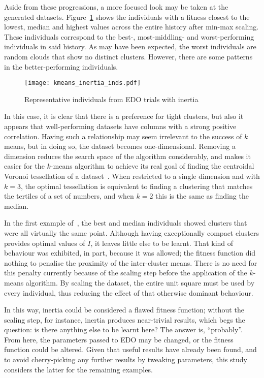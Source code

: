 Aside from these progressions, a more focused look may be taken at the generated
datasets. Figure~\ref{fig:kmeans_inertia_inds} shows the individuals with a
fitness closest to the lowest, median and highest values across the entire
history after min-max scaling. These individuals correspond to the best-,
most-middling- and worst-performing individuals in said history. As may have
been expected, the worst individuals are random clouds that show no distinct
clusters. However, there are some patterns in the better-performing individuals.

\begin{figure}[htbp]
    \centering
    \texttt{[image: kmeans\_inertia\_inds.pdf]}
    \caption{%
        Representative individuals from EDO trials with inertia
    }\label{fig:kmeans_inertia_inds}
\end{figure}

In this case, it is clear that there is a preference for tight clusters, but
also it appears that well-performing datasets have columns with a strong
positive correlation. Having such a relationship may seem irrelevant to the
success of \(k\) means, but in doing so, the dataset becomes one-dimensional.
Removing a dimension reduces the search space of the algorithm considerably, and
makes it easier for the \(k\)-means algorithm to achieve its real goal of
finding the centroidal Voronoi tessellation of a dataset~\cite{Du2006}. When
restricted to a single dimension and with \(k = 3\), the optimal tessellation is
equivalent to finding a clustering that matches the tertiles of a set of
numbers, and when \(k = 2\) this is the same as finding the median.

In the first example of~\cite{Wilde2020:edo}, the best and median individuals
showed clusters that were all virtually the same point. Although having
exceptionally compact clusters provides optimal values of \(I\), it leaves
little else to be learnt. That kind of behaviour was exhibited, in part, because
it was allowed; the fitness function did nothing to penalise the proximity of
the inter-cluster means. There is no need for this penalty currently because of
the scaling step before the application of the \(k\)-means algorithm. By scaling
the dataset, the entire unit square must be used by every individual, thus
reducing the effect of that otherwise dominant behaviour.

In this way, inertia could be considered a flawed fitness function; without the
scaling step, for instance, inertia produces near-trivial results, which begs
the question: is there anything else to be learnt here? The answer is,
``probably''. From here, the parameters passed to EDO may be changed, or the
fitness function could be altered. Given that useful results have already been
found, and to avoid cherry-picking any further results by tweaking parameters,
this study considers the latter for the remaining examples.

